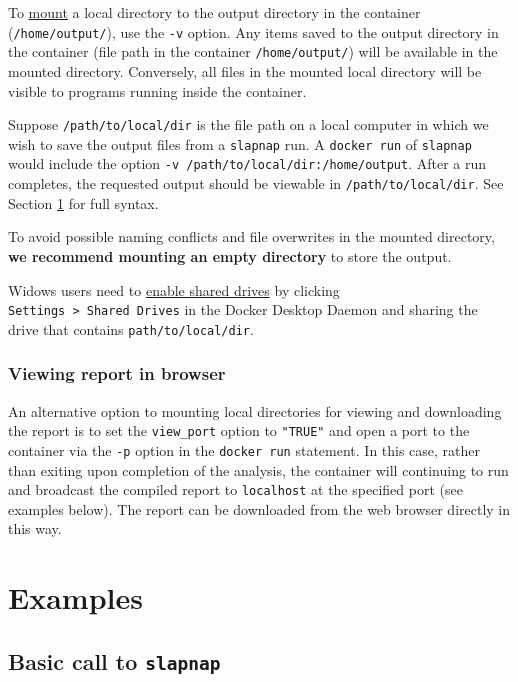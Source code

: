 \documentclass[]{article}
\begin{document}
To \href{https://docs.docker.com/storage/bind-mounts/}{mount} a local
directory to the output directory in the container
(\texttt{/home/output/}), use the \texttt{-v} option. Any items saved to
the output directory in the container (file path in the container
\texttt{/home/output/}) will be available in the mounted directory.
Conversely, all files in the mounted local directory will be visible to
programs running inside the container.

Suppose \texttt{/path/to/local/dir} is the file path on a local computer
in which we wish to save the output files from a \texttt{slapnap} run. A
\texttt{docker\ run} of \texttt{slapnap} would include the option
\texttt{-v\ /path/to/local/dir:/home/output}. After a run completes, the
requested output should be viewable in \texttt{/path/to/local/dir}. See
Section \ref{sec:examples} for full syntax.

To avoid possible naming conflicts and file overwrites in the mounted
directory, \textbf{we recommend mounting an empty directory} to store
the output.

Widows users need to
\href{https://docs.docker.com/docker-for-windows/troubleshoot/\#volume-mounting-requires-shared-drives-for-linux-containers}{enable
shared drives} by clicking
\texttt{Settings\ \textgreater{}\ Shared\ Drives} in the Docker Desktop
Daemon and sharing the drive that contains \texttt{path/to/local/dir}.

\subsubsection{Viewing report in browser}\label{sec:viewreport}

An alternative option to mounting local directories for viewing and
downloading the report is to set the \texttt{view\_port} option to
\texttt{"TRUE"} and open a port to the container via the \texttt{-p}
option in the \texttt{docker\ run} statement. In this case, rather than
exiting upon completion of the analysis, the container will continuing
to run and broadcast the compiled report to \texttt{localhost} at the
specified port (see examples below). The report can be downloaded from
the web browser directly in this way.

\section{Examples}\label{sec:examples}

\subsection{\texorpdfstring{Basic call to
\texttt{slapnap}}{Basic call to slapnap}}\label{basic-call-to-slapnap}
\end{document}
